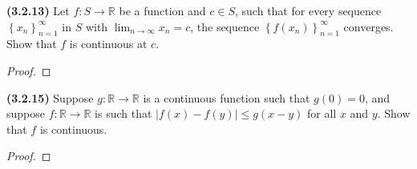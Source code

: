 \documentclass[12pt]{article}
\newcommand{\limtoinf}[1][n]{\displaystyle\lim_{ {#1} \to \infty}}
\newcommand{\abs}[1]{\left| {#1} \right|}
\newcommand{\seq}[2][n]{\left\{ {#2} \right\}_{#1=1}^\infty}
\newcommand{\bR}{\mathbb{R}}
\begin{document}
\newpage

\noindent \textbf{(3.2.13)} Let $f:S\to\bR$ be a function and $c\in S$, such that for every sequence $\seq{x_n}$ in $S$ with $\limtoinf x_n=c$, the sequence $\seq{f(x_n)}$ converges. Show that $f$ is continuous at $c$.

\begin{proof}
	\lipsum[1]
\end{proof}

\newpage

\noindent \textbf{(3.2.15)} Suppose $g:\bR\to\bR$ is a continuous function such that $g(0)=0$, and suppose $f:\bR\to\bR$ is such that $\abs{f(x)-f(y)}\le g(x-y)$ for all $x$ and $y$. Show that $f$ is continuous.

\begin{proof}
	\lipsum[1]
\end{proof}
\end{document}
